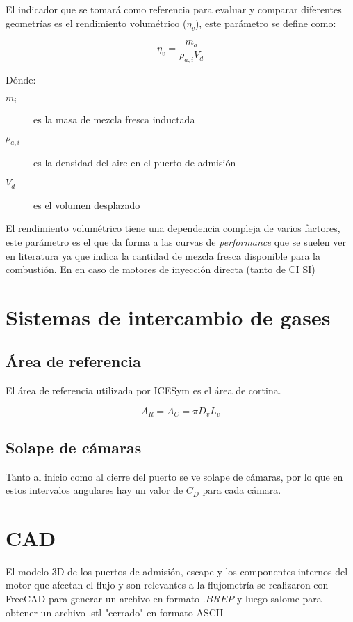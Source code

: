 El indicador que se tomará como referencia para evaluar y comparar diferentes
geometrías es el rendimiento volumétrico ($\eta_v$), este parámetro se define
como:

\begin{equation}
    \eta_v = \frac{m_a}{\rho_{a,i}V_d}
\end{equation}

Dónde:
%
\begin{description}
    \item[$m_i$] es la masa de mezcla fresca inductada
    \item[$\rho_{a,i}$] es la densidad del aire en el puerto de admisión
    \item[$V_d$] es el volumen desplazado
\end{description}

El rendimiento volumétrico tiene una dependencia compleja de varios factores,
este parámetro es el que da forma a las curvas de \emph{performance} que se
suelen ver en literatura ya que indica la cantidad de mezcla fresca disponible
para la combustión. 
%
En en caso de motores de inyección directa (tanto de CI SI)

\section{Sistemas de intercambio de gases}
%
\subsection{Área de referencia}
%
El área de referencia utilizada por ICESym es el área de cortina.

$$ A_R = A_C = \pi D_v L_v $$

\subsection{Solape de cámaras}
%
Tanto al inicio como al cierre del puerto se ve solape de cámaras, por lo que
en estos intervalos angulares hay un valor de $C_D$ para cada cámara.

\section{CAD}
%
El modelo 3D de los puertos de admisión, escape y los componentes internos del
motor que afectan el flujo y son relevantes a la flujometría se realizaron con
FreeCAD\cite{freecad} para generar un archivo en formato $.BREP$ y luego
salome\cite{salome} para obtener un archivo .stl "cerrado" en formato ASCII

